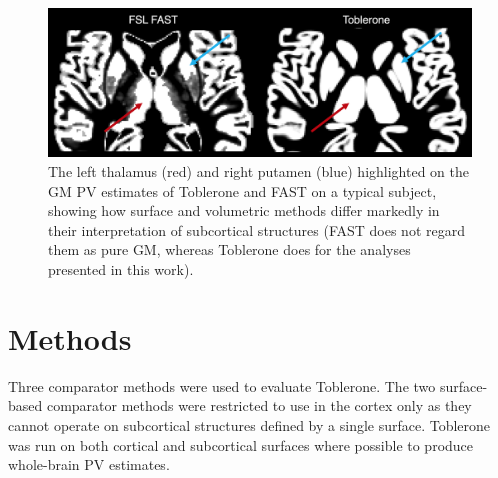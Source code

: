 \documentclass[12pt]{report}
\begin{document}
\begin{figure}[H]
\centering
\includegraphics[width = \textwidth]{subcortical_gm_differences.png}
\caption{The left thalamus (red) and right putamen (blue) highlighted on the GM PV estimates of Toblerone and FAST on a typical subject, showing how surface and volumetric methods differ markedly in their interpretation of subcortical structures (FAST does not regard them as pure GM, whereas Toblerone does for the analyses presented in this work).}
\label{subcortical_gm_differences}
\end{figure}

\section{Methods}

\label{tob_pv_evaluation}

Three comparator methods were used to evaluate Toblerone. The two surface-based comparator methods were restricted to use in the cortex only as they cannot operate on subcortical structures defined by a single surface. Toblerone was run on both cortical and subcortical surfaces where possible to produce whole-brain PV estimates. 
\end{document}
